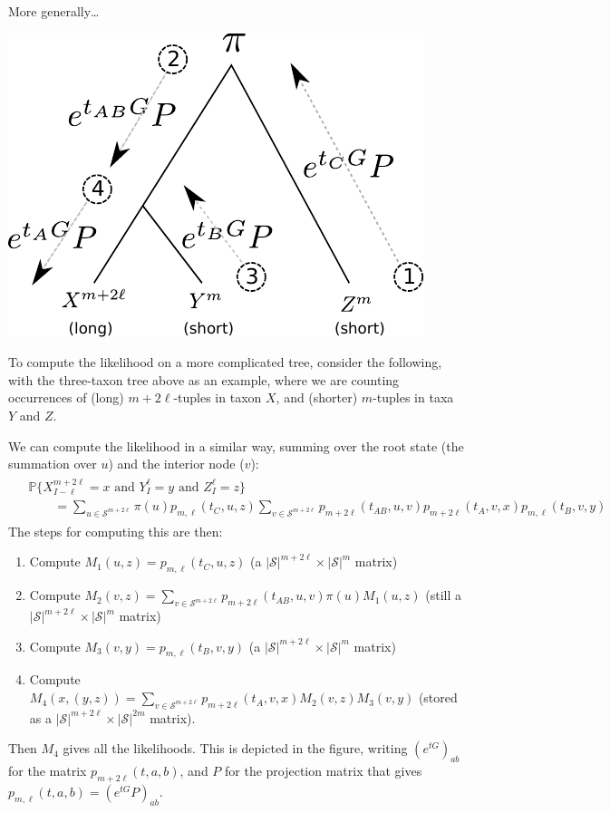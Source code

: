 \documentclass{article}
\renewcommand{\P}{\mathbb{P}}
\newcommand{\calS}{\mathcal{S}}  %
\theoremstyle{plain}
\theoremstyle{definition}
\begin{document}
More generally\dots

\begin{center}
\includegraphics{peeling-schematic}
\end{center}

To compute the likelihood on a more complicated tree, consider the following,
with the three-taxon tree above as an example,
where we are counting occurrences of (long) $m+2\ell$-tuples in taxon $X$,
and (shorter) $m$-tuples in taxa $Y$ and $Z$.

We can compute the likelihood in a similar way, summing over the root state (the summation over $u$)
and the interior node ($v$):
\begin{align} \label{eqn:three_taxa_likelihood}
  \begin{split}
    & \P\{X_{I-\ell}^{m+2\ell}=x \text{ and } Y_I^\ell=y \text{ and } Z_I^\ell=z \} \\
    &\qquad = \sum_{u \in \calS^{m+2\ell}} \pi(u) p_{m,\ell}(t_C,u,z) \sum_{v \in \calS^{m+2\ell}} p_{m+2\ell}(t_{AB},u,v) p_{m+2\ell}(t_{A},v,x) p_{m,\ell}(t_B,v,y)
  \end{split}
\end{align}
The steps for computing this are then:
\begin{enumerate}

  \item Compute $M_1(u,z) = p_{m,\ell}(t_C,u,z)$ (a $|\calS|^{m+2\ell} \times |\calS|^m$ matrix)

  \item Compute $M_2(v,z) = \sum_{v \in \calS^{m+2\ell}}  p_{m+2\ell}(t_{AB},u,v) \pi(u) M_1(u,z)$ (still a $|\calS|^{m+2\ell} \times |\calS|^m$ matrix)

  \item Compute $M_3(v,y) = p_{m,\ell}(t_B,v,y)$ (a $|\calS|^{m+2\ell} \times |\calS|^m$ matrix)

  \item Compute $M_4(x,(y,z)) = \sum_{v \in \calS^{m+2\ell}} p_{m+2\ell}(t_{A},v,x) M_2(v,z) M_3(v,y)$ (stored as a $|\calS|^{m+2\ell} \times |\calS|^{2m}$ matrix).

\end{enumerate}
Then $M_4$ gives all the likelihoods.
This is depicted in the figure, writing $\left(e^{tG}\right)_{ab}$ for the matrix $p_{m+2\ell}(t,a,b)$,
and $P$ for the projection matrix that gives $p_{m,\ell}(t,a,b) = \left( e^{tG} P\right)_{ab}$.
\end{document}
